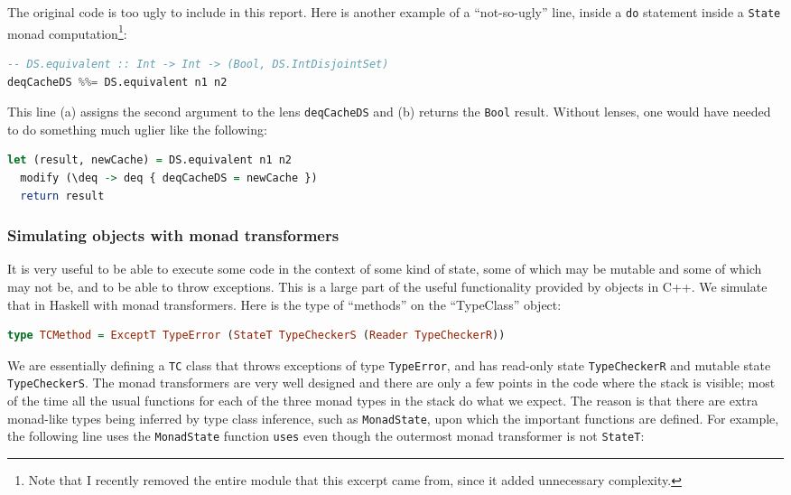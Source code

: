 \documentclass{article}
\begin{document}
\begin{spacing}{1.1}
The original code is too ugly to include in this report. Here is another example of a ``not-so-ugly'' line, inside a \lstinline{do} statement inside a \lstinline{State} monad computation\footnote{Note that I recently removed the entire module that this excerpt came from, since it added unnecessary complexity.}:
\begin{lstlisting}[language=Haskell]
-- DS.equivalent :: Int -> Int -> (Bool, DS.IntDisjointSet)
deqCacheDS %%= DS.equivalent n1 n2
\end{lstlisting}
This line (a) assigns the second argument to the lens \lstinline{deqCacheDS} and (b) returns the \lstinline{Bool} result. Without lenses, one would have needed to do something much uglier like the following:
\begin{lstlisting}[language=Haskell]
  let (result, newCache) = DS.equivalent n1 n2
  modify (\deq -> deq { deqCacheDS = newCache })
  return result
\end{lstlisting}

\subsubsection{Simulating objects with monad transformers}

It is very useful to be able to execute some code in the context of some kind of state, some of which may be mutable and some of which may not be, and to be able to throw exceptions. This is a large part of the useful functionality provided by objects in C++. We simulate that in Haskell with monad transformers. Here is the type of ``methods'' on the ``TypeClass'' object:
\begin{lstlisting}[language=Haskell]
type TCMethod = ExceptT TypeError (StateT TypeCheckerS (Reader TypeCheckerR))
\end{lstlisting}

We are essentially defining a \lstinline{TC} class that throws exceptions of type \lstinline{TypeError}, and has read-only state \lstinline{TypeCheckerR} and mutable state \lstinline{TypeCheckerS}. The monad transformers are very well designed and there are only a few points in the code where the stack is visible; most of the time all the usual functions for each of the three monad types in the stack do what we expect. The reason is that there are extra monad-like types being inferred by type class inference, such as \lstinline{MonadState}, upon which the important functions are defined. For example, the following line uses the \lstinline{MonadState} function \lstinline{uses} even though the outermost monad transformer is not \lstinline{StateT}:


\end{spacing}
\end{document}
